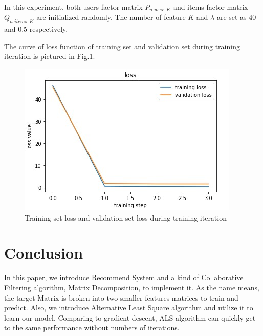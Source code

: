 \documentclass[journal, a4paper]{IEEEtran}
\begin{document}
In this experiment, both users factor matrix $P_{n\_user,K}$ and items factor matrix $Q_{n\_items,K}$ are initialized randomly. 
The number of feature $K$ and $\lambda$ are set as 40 and 0.5 respectively.

The curve of loss function of training set and validation set during training iteration is pictured in Fig.\ref{fig:loss}.
\begin{figure}[!hbt]
		\begin{center}
		\includegraphics[width=\columnwidth]{Recommend_System_loss}
		\caption{Training set loss and validation set loss during training iteration}
		\label{fig:loss}
		\end{center}
	\end{figure}
\section{Conclusion}
In this paper, we introduce Recommend System and a kind of Collaborative Filtering algorithm, Matrix Decomposition, to implement it.
As the name means, the target Matrix is broken into two smaller features matrices to train and predict.
Also, we introduce Alternative Least Square algorithm and utilize it to learn our model.
Comparing to gradient descent, ALS algorithm can quickly get to the same performance without numbers of iterations.
\end{document}
